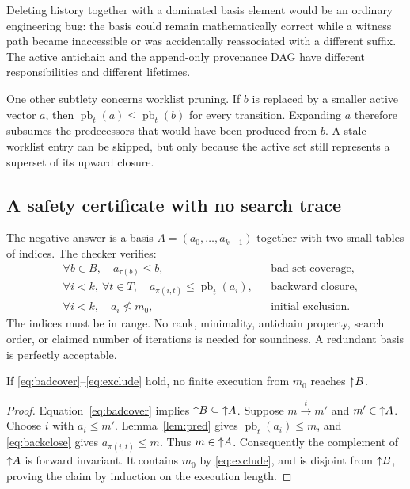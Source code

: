 Deleting history together with a dominated basis element would be an ordinary engineering bug: the basis could remain mathematically correct while a witness path became inaccessible or was accidentally reassociated with a different suffix. The active antichain and the append-only provenance DAG have different responsibilities and different lifetimes.

One other subtlety concerns worklist pruning. If $b$ is replaced by a smaller active vector $a$, then $\operatorname{pb}_t(a)\le\operatorname{pb}_t(b)$ for every transition. Expanding $a$ therefore subsumes the predecessors that would have been produced from $b$. A stale worklist entry can be skipped, but only because the active set still represents a superset of its upward closure.

\subsection{A safety certificate with no search trace}
The negative answer is a basis $A=(a_0,\ldots,a_{k-1})$ together with two small tables of indices. The checker verifies:
\begin{align}
 &\forall b\in B,\quad a_{\tau(b)}\le b,
 &&\text{bad-set coverage}, \label{eq:badcover}\\
 &\forall i<k,\ \forall t\in T,\quad
 a_{\pi(i,t)}\le\operatorname{pb}_t(a_i),
 &&\text{backward closure}, \label{eq:backclose}\\
 &\forall i<k,\quad a_i\nleq m_0,
 &&\text{initial exclusion}. \label{eq:exclude}
\end{align}
The indices must be in range. No rank, minimality, antichain property, search order, or claimed number of iterations is needed for soundness. A redundant basis is perfectly acceptable.

\begin{theorem}
\label{thm:safety}
If \eqref{eq:badcover}--\eqref{eq:exclude} hold, no finite execution from $m_0$ reaches $\mathord{\uparrow}B$.
\end{theorem}
\begin{proof}
Equation~\eqref{eq:badcover} implies $\mathord{\uparrow}B\subseteq\mathord{\uparrow}A$. Suppose $m\xrightarrow{t}m'$ and $m'\in\mathord{\uparrow}A$. Choose $i$ with $a_i\le m'$. Lemma~\ref{lem:pred} gives $\operatorname{pb}_t(a_i)\le m$, and \eqref{eq:backclose} gives $a_{\pi(i,t)}\le m$. Thus $m\in\mathord{\uparrow}A$. Consequently the complement of $\mathord{\uparrow}A$ is forward invariant. It contains $m_0$ by \eqref{eq:exclude}, and is disjoint from $\mathord{\uparrow}B$, proving the claim by induction on the execution length.
\end{proof}

